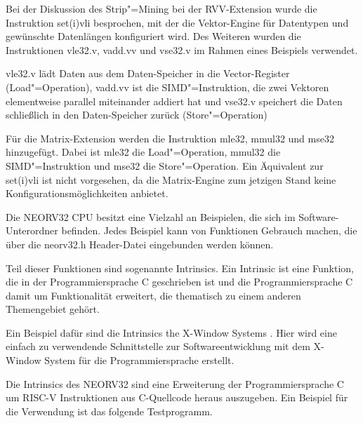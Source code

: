 Bei der Diskussion des Strip"=Mining bei der \gls{RVV}-Extension wurde die Instruktion set(i)vli besprochen, mit der die Vektor-Engine für Datentypen und gewünschte Datenlängen konfiguriert wird. Des Weiteren wurden die Instruktionen vle32.v, vadd.vv und vse32.v im Rahmen eines Beispiels verwendet.

vle32.v lädt Daten aus dem Daten-Speicher in die Vector-Register (Load"=Operation), vadd.vv ist die SIMD"=Instruktion, die zwei Vektoren elementweise parallel miteinander addiert hat und vse32.v speichert die Daten schließlich in den Daten-Speicher zurück (Store"=Operation)

Für die Matrix-Extension werden die Instruktion mle32, mmul32 und mse32 hinzugefügt. Dabei ist mle32 die Load"=Operation, mmul32 die SIMD"=Instruktion und mse32 die Store"=Operation. Ein Äquivalent zur set(i)vli ist nicht vorgesehen, da die Matrix-Engine zum jetzigen Stand keine Konfigurationsmöglichkeiten anbietet.

Die NEORV32 CPU besitzt eine Vielzahl an Beispielen, die sich im Software-Unterordner befinden. Jedes Beispiel kann von Funktionen Gebrauch machen, die über die neorv32.h Header-Datei eingebunden werden können.

Teil dieser Funktionen sind sogenannte Intrinsics. Ein Intrinsic ist eine Funktion, die in der Programmiersprache C geschrieben ist und die Programmiersprache C damit um Funktionalität erweitert, die thematisch zu einem anderen Themengebiet gehört.

Ein Beispiel dafür sind die Intrinsics the X-Window Systems \cite{XToolkitIntrinsics}. Hier wird eine einfach zu verwendende Schnittstelle zur Softwareentwicklung mit dem X-Window System für die Programmiersprache erstellt.

Die Intrinsics des NEORV32 sind eine Erweiterung der Programmiersprache C um RISC-V Instruktionen aus C-Quellcode heraus auszugeben. Ein Beispiel für die Verwendung ist das folgende Testprogramm.

